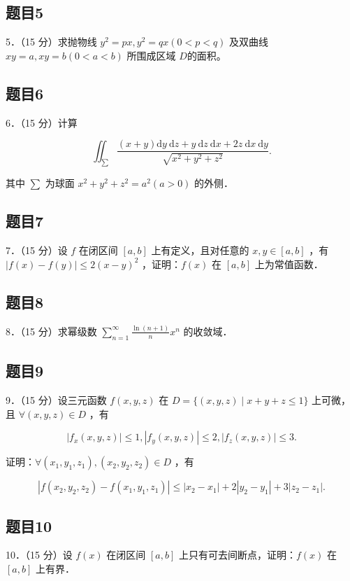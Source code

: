 \documentclass{article}
\begin{document}
\subsection{题目5}
5．（15 分）求抛物线 \(y^{2}=p x, y^{2}=q x(0<p<q)\) 及双曲线 \(x y=a, x y=b(0<a<b)\) 所围成区域 \(D\)的面积。

\subsection{题目6}
6．（15 分）计算

\[
\iint_{\sum} \frac{(x+y) \mathrm{d} y \mathrm{~d} z+y \mathrm{~d} z \mathrm{~d} x+2 z \mathrm{~d} x \mathrm{~d} y}{\sqrt{x^{2}+y^{2}+z^{2}}} .
\]

其中 \(\sum\) 为球面 \(x^{2}+y^{2}+z^{2}=a^{2}(a>0)\) 的外侧．

\subsection{题目7}
7．（15 分）设 \(f\) 在闭区间 \([a, b]\) 上有定义，且对任意的 \(x, y \in[a, b]\) ，有 \(|f(x)-f(y)| \leq 2(x-y)^{2}\) ，证明：\(f(x)\) 在 \([a, b]\) 上为常值函数．

\subsection{题目8}
8．（15 分）求幂级数 \(\sum_{n=1}^{\infty} \frac{\ln (n+1)}{n} x^{n}\) 的收敛域．

\subsection{题目9}
9．（15 分）设三元函数 \(f(x, y, z)\) 在 \(D=\{(x, y, z) \mid x+y+z \leq 1\}\) 上可微，且 \(\forall(x, y, z) \in D\) ，有

\[
\left|f_{x}(x, y, z)\right| \leq 1,\left|f_{y}(x, y, z)\right| \leq 2,\left|f_{z}(x, y, z)\right| \leq 3 .
\]

证明：\(\forall\left(x_{1}, y_{1}, z_{1}\right),\left(x_{2}, y_{2}, z_{2}\right) \in D\) ，有

\[
\left|f\left(x_{2}, y_{2}, z_{2}\right)-f\left(x_{1}, y_{1}, z_{1}\right)\right| \leq\left|x_{2}-x_{1}\right|+2\left|y_{2}-y_{1}\right|+3\left|z_{2}-z_{1}\right| .
\]

\subsection{题目10}
10．（15 分）设 \(f(x)\) 在闭区间 \([a, b]\) 上只有可去间断点，证明：\(f(x)\) 在 \([a, b]\) 上有界．
\end{document}
